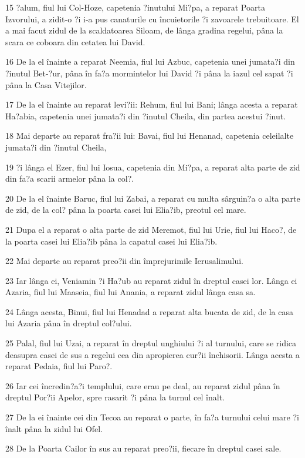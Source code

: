 \par 15 ?alum, fiul lui Col-Hoze, capetenia ?inutului Mi?pa, a reparat Poarta Izvorului, a zidit-o ?i i-a pus canaturile cu încuietorile ?i zavoarele trebuitoare. El a mai facut zidul de la scaldatoarea Siloam, de lânga gradina regelui, pâna la scara ce coboara din cetatea lui David.
\par 16 De la el înainte a reparat Neemia, fiul lui Azbuc, capetenia unei jumata?i din ?inutul Bet-?ur, pâna în fa?a mormintelor lui David ?i pâna la iazul cel sapat ?i pâna la Casa Vitejilor.
\par 17 De la el înainte au reparat levi?ii: Rehum, fiul lui Bani; lânga acesta a reparat Ha?abia, capetenia unei jumata?i din ?inutul Cheila, din partea acestui ?inut.
\par 18 Mai departe au reparat fra?ii lui: Bavai, fiul lui Henanad, capetenia celeilalte jumata?i din ?inutul Cheila,
\par 19 ?i lânga el Ezer, fiul lui Iosua, capetenia din Mi?pa, a reparat alta parte de zid din fa?a scarii armelor pâna la col?.
\par 20 De la el înainte Baruc, fiul lui Zabai, a reparat cu multa sârguin?a o alta parte de zid, de la col? pâna la poarta casei lui Elia?ib, preotul cel mare.
\par 21 Dupa el a reparat o alta parte de zid Meremot, fiul lui Urie, fiul lui Haco?, de la poarta casei lui Elia?ib pâna la capatul casei lui Elia?ib.
\par 22 Mai departe au reparat preo?ii din împrejurimile Ierusalimului.
\par 23 Iar lânga ei, Veniamin ?i Ha?ub au reparat zidul în dreptul casei lor. Lânga ei Azaria, fiul lui Maaseia, fiul lui Anania, a reparat zidul lânga casa sa.
\par 24 Lânga acesta, Binui, fiul lui Henadad a reparat alta bucata de zid, de la casa lui Azaria pâna în dreptul col?ului.
\par 25 Palal, fiul lui Uzai, a reparat în dreptul unghiului ?i al turnului, care se ridica deasupra casei de sus a regelui cea din apropierea cur?ii închisorii. Lânga acesta a reparat Pedaia, fiul lui Paro?.
\par 26 Iar cei încredin?a?i templului, care erau pe deal, au reparat zidul pâna în dreptul Por?ii Apelor, spre rasarit ?i pâna la turnul cel înalt.
\par 27 De la ei înainte cei din Tecoa au reparat o parte, în fa?a turnului celui mare ?i înalt pâna la zidul lui Ofel.
\par 28 De la Poarta Cailor în sus au reparat preo?ii, fiecare în dreptul casei sale.
